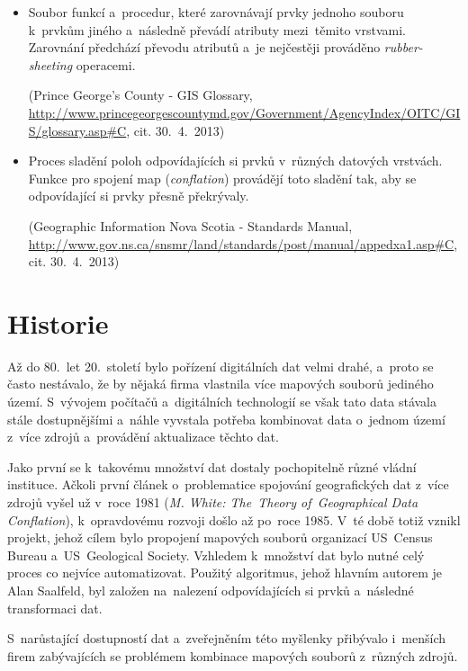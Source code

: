 \begin{itemize}
  \item Soubor funkcí a~procedur, které zarovnávají prvky jednoho  
    souboru k~prvkům jiného a~následně převádí atributy mezi~těmito vrstvami.
    Zarovnání předchází převodu atributů a~je nejčestěji prováděno 
    \textit{rubber-sheeting} operacemi.
   
    (Prince George's County - GIS Glossary,
    \url{http://www.princegeorgescountymd.gov/Government/AgencyIndex/OITC/GIS/glossary.asp#C},
    cit. 30.~4.~2013)

  \item Proces sladění poloh odpovídajících si prvků v~různých datových 
    vrstvách. Funkce pro spojení map (\textit{conflation}) provádějí toto 
    sladění tak, aby se odpovídající si prvky přesně překrývaly. 
    
    (Geographic Information Nova Scotia - Standards Manual,
    \url{http://www.gov.ns.ca/snsmr/land/standards/post/manual/appedxa1.asp#C},
     cit. 30.~4.~2013)

\end{itemize}

\section{Historie}
\label{historie}

Až do 80.~let 20.~století bylo pořízení digitálních dat velmi drahé, a~proto 
se často nestávalo, že by nějaká firma vlastnila více mapových souborů jediného 
území. S~vývojem počítačů a~digitálních technologií se však tato data stávala 
stále do\-stupnějšími a~náhle vyvstala potřeba kombinovat data o~jednom území 
z~více zdrojů a~provádění aktualizace těchto dat. 

Jako první se k~takovému množství dat dostaly pochopitelně různé vládní 
instituce. Ačkoli první článek o~problematice spojování geografických dat 
z~více zdrojů vyšel už v~roce 1981 (\textit{M. White: The~Theory of~Geographical
Data Conflation}), k~opravdovému rozvoji došlo až po~roce 1985. V~té době 
totiž vznikl projekt, jehož cílem bylo propojení mapových souborů organizací
US~Census Bureau a~US~Geological Society. Vzhledem k~množství dat bylo nutné
celý proces co nejvíce auto\-matizovat. Použitý algoritmus, jehož hlavním autorem
je Alan Saalfeld, byl založen na~nalezení odpovídajících si prvků a~následné 
transformaci dat. 

S~narůstající dostupností dat a~zveřejněním této myšlenky přibývalo i~menších 
firem zabývajících se problémem kombinace mapových souborů z~různých zdrojů.

